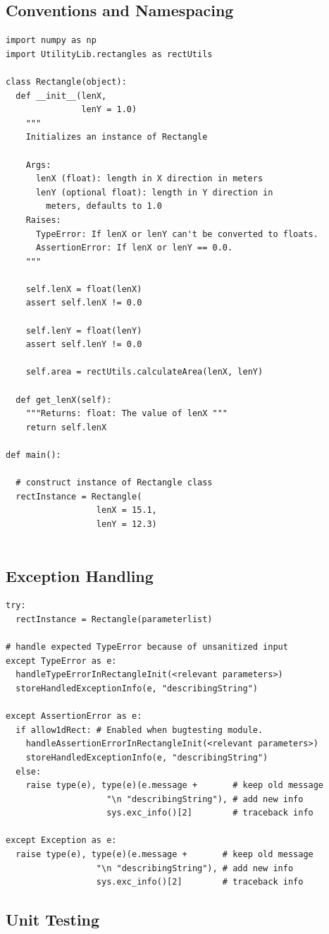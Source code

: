 \documentclass[10pt,a4paper]{article}
\begin{document}
\subsection{Conventions and Namespacing}
\begin{lstlisting}
import numpy as np
import UtilityLib.rectangles as rectUtils

class Rectangle(object):
  def __init__(lenX, 
               lenY = 1.0) 
    """
    Initializes an instance of Rectangle
    
    Args: 
      lenX (float): length in X direction in meters
      lenY (optional float): length in Y direction in 
        meters, defaults to 1.0
    Raises:
      TypeError: If lenX or lenY can't be converted to floats.
      AssertionError: If lenX or lenY == 0.0.
    """
    
    self.lenX = float(lenX)
    assert self.lenX != 0.0
    
    self.lenY = float(lenY)
    assert self.lenY != 0.0

    self.area = rectUtils.calculateArea(lenX, lenY)

  def get_lenX(self):
    """Returns: float: The value of lenX """
    return self.lenX

def main():

  # construct instance of Rectangle class
  rectInstance = Rectangle(
                  lenX = 15.1, 
                  lenY = 12.3)
	
\end{lstlisting}


\subsection{Exception Handling}

\begin{lstlisting}
try: 
  rectInstance = Rectangle(parameterlist)

# handle expected TypeError because of unsanitized input 
except TypeError as e:  
  handleTypeErrorInRectangleInit(<relevant parameters>)
  storeHandledExceptionInfo(e, "describingString")
  
except AssertionError as e: 
  if allow1dRect: # Enabled when bugtesting module. 
    handleAssertionErrorInRectangleInit(<relevant parameters>)
    storeHandledExceptionInfo(e, "describingString")
  else:
    raise type(e), type(e)(e.message +       # keep old message
                    "\n "describingString"), # add new info
                    sys.exc_info()[2]        # traceback info
  
except Exception as e: 
  raise type(e), type(e)(e.message +       # keep old message
                  "\n "describingString"), # add new info
                  sys.exc_info()[2]        # traceback info
\end{lstlisting}

\subsection{Unit Testing}
\end{document}

